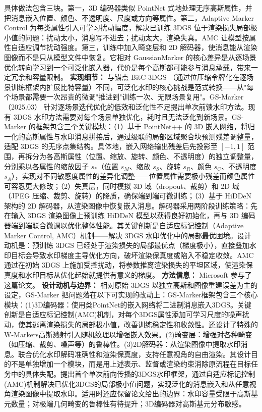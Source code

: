 具体做法包含三块。第一，3D 编码器类似 PointNet 式地处理无序高斯属性，并把消息嵌入位置、颜色、不透明度、尺度或方向等属性。第二，Adaptive Marker Control 为每类属性引入可学习扰动幅度，解决已训练 3DGS 位于渲染损失局部极小值的问题：扰动太小，消息写不进去；扰动太大，渲染失真。AMC 让模型按属性自适应调节扰动强度。第三，训练中加入畸变层和 2D 解码器，使消息能从渲染图像而不是只从模型文件中恢复。它相对 GaussianMarker 的核心差异是从逐场景优化转向学习到一个可泛化嵌入器，代价是每个高斯都可能参与消息承载，带来一定冗余和容量限制。
\textbf{实现细节：} 与锚点 BitC-3DGS （通过位压缩令牌化在逐场景训练框架内扩展比特容量）不同，可泛化水印的核心挑战是范式转换——从"每个场景都需要一次昂贵的微调"推进到"训练一次、无限场景复用"。GS-Marker（2025.03） 针对逐场景迭代优化的低效和泛化性不足提出单次前馈水印方法。现有 3DGS 水印方法需要对每个场景单独优化，耗时且无法泛化到新场景。GS-Marker 的框架包含三个关键模块：（1）基于 PointNet++ 的 3D 嵌入网络，将归一化的高斯属性与水印消息拼接后，通过级联的局部区域聚合块预测残差调整量，适配 3DGS 的无序点集结构。具体地，嵌入网络输出残差后先投影至 $[-1, 1]$ 范围，再拆分为各高斯属性（位置、缩放、旋转、颜色、不透明度）的独立调整量，分别乘以各属性的缩放因子 $s_*$（位置 $s_M$、缩放 $s_S$、旋转 $s_R$、颜色 $s_C$、不透明度 $s_A$），实现对不同敏感度属性的差异化调整——位置属性需要极小残差而颜色属性可容忍更大修改；（2）失真层，同时模拟 3D 域（dropout、裁剪）和 2D 域（JPEG 压缩、裁剪、旋转）的降质，确保端到端可微训练；（3）基于 HiDDeN 架构的 2D 解码器，从渲染图像中恢复嵌入消息。解码器采用两阶段训练策略：先在输入 3DGS 渲染图像上预训练 HiDDeN 模型以获得良好初始化，再与 3D 编码器端到端联合微调以优化整体性能。其关键创新是自适应标记控制（Adaptive Marker Control, AMC）机制——解决 3DGS 水印优化中的局部最优困境。设计动机是：预训练 3DGS 已经处于渲染损失的局部最优点（梯度极小），直接叠加水印目标会导致水印梯度主导优化方向，破坏渲染保真度或陷入不稳定收敛。AMC 通过在初始 3DGS 上施加受控扰动，将参数推离渲染损失的平坦区域，使渲染保真度和水印目标从优化起始就提供有意义的梯度。
\textbf{方法信息：} Microsoft 参与了这篇论文。
\textbf{设计动机与边界：} 相对原始 3DGS 以独立高斯和图像重建误差为主的设定，GS-Marker 把问题落在以下可实现的改动上：GS-Marker框架包含三个核心模块：(1)3D编码器：使用类PointNet的嵌入网络将二进制消息嵌入3DGS。关键创新是自适应标记控制(AMC)机制，对每个3DGS属性添加可学习尺度的噪声扰动，使其逃离渲染损失的局部极小值，改善训练稳定性和收敛性。还设计了特殊的W-Markers高斯溅射引入随机纹理以增强嵌入效果。(2)畸变层：增强对各种畸变（如压缩、裁剪、噪声等）的鲁棒性。(3)2D解码器：从渲染图像中提取水印消息。联合优化水印解码准确性和渲染保真度，支持任意视角的自由渲染。其设计目的不是单独增加一个模块，而是用上述表示、监督或渲染约束消除原流程在目标任务中的具体失配。提出首个单次前向传播的3DGS水印框架，通过自适应标记控制(AMC)机制解决已优化3DGS的局部极小值问题，实现泛化的消息嵌入和从任意视角渲染图像中提取水印。适用时还应保留论文给出的边界：水印容量受限于高斯基元数量；对极端几何畸变的鲁棒性有待提升；3D编码器对高斯基元分布敏感。

